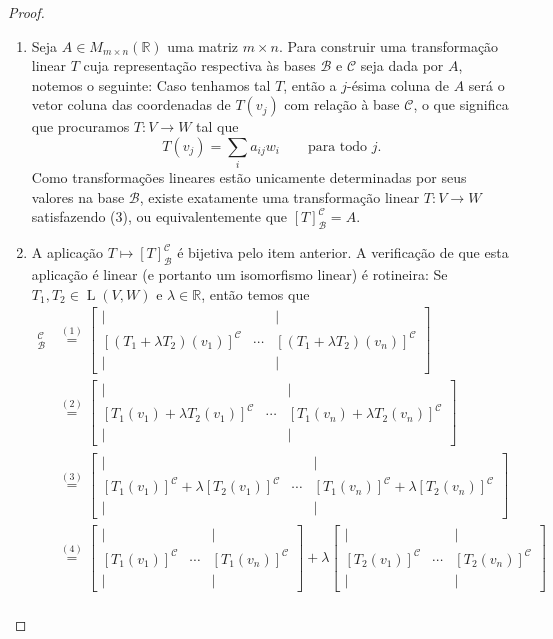\begin{proof}
\begin{enumerate}
		\item Seja $A\in M_{m\times n}(\mathbb{R})$ uma matriz $m\times n$. Para construir uma transformação linear $T$ cuja representação respectiva às bases $\mathcal{B}$ e $\mathcal{C}$ seja dada por $A$, notemos o seguinte: Caso tenhamos tal $T$, então a $j$-ésima coluna de $A$ será o vetor coluna das coordenadas de $T(v_j)$ com relação à base $\mathcal{C}$, o que significa que procuramos $T\colon V\to W$ tal que
		\[T(v_j)=\sum_i a_{ij}w_i\qquad\text{para todo }j.\tag{3}\]
		Como transformações lineares estão unicamente determinadas por seus valores na base $\mathcal{B}$, existe exatamente uma transformação linear $T\colon V\to W$ satisfazendo (3), ou equivalentemente que $[T]_{\mathcal{B}}^{\mathcal{C}}=A$.
		
		\item A aplicação $T\mapsto [T]_{\mathcal{B}}^{\mathcal{C}}$ é bijetiva pelo item anterior. A verificação de que esta aplicação é linear (e portanto um isomorfismo linear) é rotineira: Se $T_1,T_2\in\operatorname{L}(V,W)$ e $\lambda\in\mathbb{R}$, então temos que
		\begin{align*}
			[T_1+\lambda T_2]_{\mathcal{B}}^{\mathcal{C}}
				&\overset{(1)}{=}\begin{bmatrix}|&&|\\ [(T_1+\lambda T_2)(v_1)]^{\mathcal{C}}&\cdots&[(T_1+\lambda T_2)(v_n)]^{\mathcal{C}}\\|&&|\end{bmatrix}\\
				&\overset{(2)}{=}\begin{bmatrix}|&&|\\ [T_1(v_1)+\lambda T_2(v_1)]^{\mathcal{C}}&\cdots&[T_1(v_n)+\lambda T_2(v_n)]^{\mathcal{C}}\\|&&|\end{bmatrix}\\
				&\overset{(3)}{=}\begin{bmatrix}|&&|\\ [T_1(v_1)]^{\mathcal{C}}+\lambda [T_2(v_1)]^{\mathcal{C}}&\cdots&[T_1(v_n)]^{\mathcal{C}}+\lambda[T_2(v_n)]^{\mathcal{C}}\\|&&|\end{bmatrix}\\
				&\overset{(4)}{=}\begin{bmatrix}|&&|\\ [T_1(v_1)]^{\mathcal{C}}&\cdots&[T_1(v_n)]^{\mathcal{C}}\\|&&|\end{bmatrix}+\lambda\begin{bmatrix}|&&|\\ [T_2(v_1)]^{\mathcal{C}}&\cdots&[T_2(v_n)]^{\mathcal{C}}\\|&&|\end{bmatrix}\\

\end{align*}
\end{enumerate}
\end{proof}
